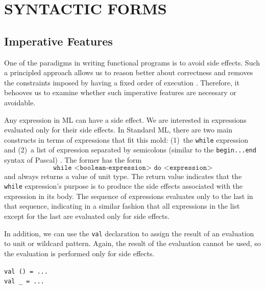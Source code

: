\documentclass[12pt,abstracton]{scrartcl}
\begin{document}
\section{SYNTACTIC FORMS}\label{sec:syntax}
\subsection{Imperative Features}\label{subsec:imper}
One of the paradigms in writing functional programs is to avoid side effects.
Such a principled approach allows us to reason better about correctness and
removes the constraints imposed by having a fixed order of execution \cite{Hug90}. Therefore,
it behooves us to examine whether such imperative features are necessary or avoidable.

Any expression in ML can have a side effect. 
We are interested in expressions evaluated only for their side effects.
In Standard ML, there are two main constructs in terms of expressions that fit this mold:
(1)~the \texttt{while} expression and (2)~a list of expression separated by semicolons (similar to the \texttt{begin...end} syntax of Pascal) \cite{Ull98}.
The former has the form
\[\texttt{while <boolean-expression> do <expression>}\] and always returns a value of unit type.
The return value indicates that the \texttt{while} expression's purpose is to produce the side effects associated
with the expression in its body. The sequence of expressions evaluates only to the last in that sequence, indicating
in a similar fashion that all expressions in the list except for the last are evaluated only for side effects.

In addition, we can use the \texttt{val} declaration to assign the result
of an evaluation to unit or wildcard pattern. Again, the result of the evaluation
cannot be used, so the evaluation is performed only for side effects.
\begin{center}
\texttt{val () = ...}\\
\texttt{val \_ = ...}
\end{center}
\end{document}
